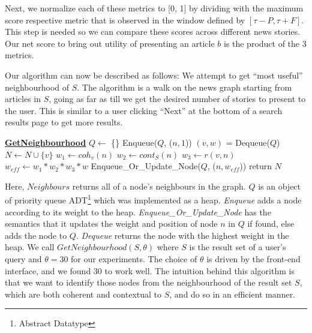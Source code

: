 Next, we normalize each of these metrics to [0, 1] by dividing with the maximum score respective metric that is observed in the window defined by $[\tau - P, \tau + F]$. This
step is needed so we can compare these scores across different news stories. Our net score to bring out utility of presenting an article $b$ is the product of the 3 metrics.

Our algorithm can now be described as follows: We attempt to get ``most useful'' neighbourhood of $S$. The algorithm is a walk on the news graph starting from articles in $S$, 
going as far as till we get the desired number of stories to present to the user. This is similar to a user clicking ``Next'' at the bottom of a search results page to get more results. 

\begin{algorithmic}
  \State \textbf{\underline{GetNeighbourhood}}
  \State {}
  \State {}
    \State $Q \leftarrow$ \{\} 
      \State Enqueue($Q$, ($n, 1$))
    \EndFor
      \State $(v, w)$ = Dequeue($Q$)
      \State $N \leftarrow N \cup \{v\}$
        \State $w_1 \leftarrow coh_{v}(n)$
        \State $w_2 \leftarrow cont_{S}(n)$
        \State $w_3 \leftarrow r(v,n)$
        \State $w_{eff} \leftarrow w_1 * w_2 * w_3 * w$
        \State Enqueue\_Or\_Update\_Node($Q$, ($n, w_{eff}$))
      \EndFor
    \EndWhile
    \State return $N$
\end{algorithmic}

Here, $Neighbours$ returns all of a node's neighbours in the graph. $Q$ is an object of priority queue ADT\footnote{Abstract Datatype} which was implemented as a heap. \emph{Enqueue} adds a node according to its weight to the heap. \emph{Enqueue\_Or\_Update\_Node} has the semantics that it updates the weight and position of node $n$ in $Q$ if found, else adds the node to $Q$.
\emph{Dequeue} returns the node with the highest weight in the heap. We call $GetNeighbourhood(S, \theta)$ where $S$ is the result set of a user's query and $\theta = 30$ for our experiments. The choice of $\theta$ is driven by the front-end interface, and we found 30 to work well.
The intuition behind this algorithm is that we want to identify those nodes from the neighbourhood of the result set $S$, which are both coherent and contextual to $S$, and do so in an efficient manner.

